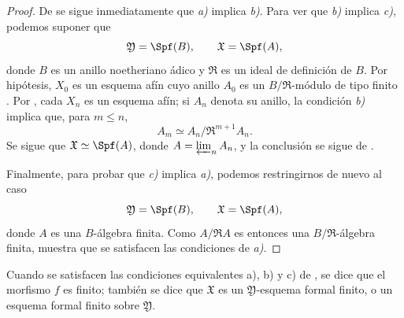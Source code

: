 \documentclass[oneside]{amsart}
\renewcommand{\leq}{\leqslant}
\let\EGAOriginalLabel\label
\renewcommand{\label}[1]{\phantomsection\EGAOriginalLabel{#1}}
\begin{document}
\begin{proof}
De  se sigue inmediatamente que \emph{a)} implica
\emph{b)}. Para ver que \emph{b)} implica \emph{c)}, podemos suponer
que
\[
  \mathfrak{Y}=\Spf(B),\qquad \mathfrak{X}=\Spf(A),
\]
donde $B$ es un anillo noetheriano ádico y $\mathfrak{R}$ es un ideal
de definición de $B$. Por hipótesis, $X_0$ es un esquema afín
cuyo anillo $A_0$ es un $B/\mathfrak{R}$-módulo de tipo finito
. Por , cada $X_n$ es un esquema
afín; si $A_n$ denota su anillo, la condición \emph{b)} implica que,
para $m\leq n$,
\[
  A_m\simeq A_n/\mathfrak{R}^{m+1}A_n.
\]
Se sigue que $\mathfrak{X}\simeq\Spf(A)$, donde
$A=\varprojlim_n A_n$, y la conclusión se sigue de
.

Finalmente, para probar que \emph{c)} implica \emph{a)}, podemos restringirnos
de nuevo al caso
\[
  \mathfrak{Y}=\Spf(B),\qquad \mathfrak{X}=\Spf(A),
\]
donde $A$ es una $B$-álgebra finita. Como
$A/\mathfrak{R}A$ es entonces una
$B/\mathfrak{R}$-álgebra finita,  muestra que se
satisfacen las condiciones de \emph{a)}.
\end{proof}

\begin{definition}[4.8.2]
\label{III.4.8.2}
Cuando se satisfacen las condiciones equivalentes \textup{a)}, \textup{b)} y \textup{c)}
de , se dice que el morfismo $f$ es
finito; también se dice que $\mathfrak{X}$ es un
$\mathfrak{Y}$-esquema formal finito, o un esquema
formal finito sobre $\mathfrak{Y}$.
\end{definition}
\end{document}
